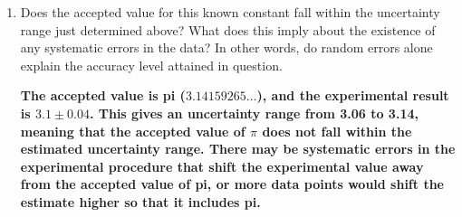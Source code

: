 \begin{enumerate}
	\item Does the accepted value for this known constant fall within the uncertainty range just determined above? What does this imply about the existence of any systematic errors in the data? In other words, do random errors alone explain the accuracy level attained in question.

	      \textbf{The accepted value is pi ($3.14159265\ldots$), and the experimental result is $3.1 \pm 0.04$. This gives an uncertainty range from 3.06 to 3.14, meaning that the accepted value of $\pi$ does not fall within the estimated uncertainty range. There may be systematic errors in the experimental procedure that shift the experimental value away from the accepted value of pi, or more data points would shift the estimate higher so that it includes pi.}
\end{enumerate}
